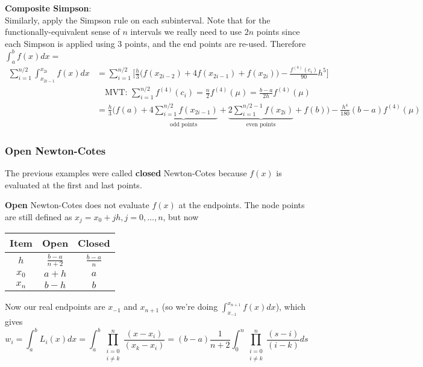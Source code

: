 \documentclass[12pt]{article}
\begin{document}
\textbf{Composite Simpson}:\\
Similarly, apply the Simpson rule on each subinterval. Note that for the functionally-equivalent sense of $n$ intervals we really need to use $2n$ points since each Simpson is applied using 3 points, and the end points are re-used. Therefore $\int_{a}^{b} f(x)dx = $
%
\begin{align*}
\sum_{i=1}^{n/2}\int_{x_{2i-1}}^{x_{2i}} f(x)dx &= \sum_{i=1}^{n/2} \bigl[ \frac{h}{3}\bigl(f(x_{2i-2}) + 4f(x_{2i-1}) + f(x_{2i})\bigr) - \frac{f^{(4)}(c_i)}{90}h^5 \bigr]\\
&\quad \text{MVT: } \sum_{i=1}^{n/2}f^{(4)}(c_i) = \frac{n}{2}f^{(4)}(\mu) = \frac{b-a}{2h}f^{(4)}(\mu)\\
&= \frac{h}{3}\bigl(f(a) + \underbrace{4\sum_{i=1}^{n/2} f(x_{2i-1})}_{\text{odd points}} + \underbrace{2\sum_{i=1}^{n/2-1} f(x_{2i})}_{\text{even points}} + f(b)\bigr) - \frac{h^4}{180}(b-a)f^{(4)}(\mu)
\end{align*}


\subsubsection*{Open Newton-Cotes}
The previous examples were called \textbf{closed} Newton-Cotes because $f(x)$ is evaluated at the first and last points.

\textbf{Open} Newton-Cotes does not evaluate $f(x)$ at the endpoints. The node points are still defined as $x_{j} = x_0 + jh, j = 0, \dots, n$,  but now 
\vspace*{-1em}
\begin{center}
\begin{tabular}{c c c}
Item & Open & Closed \\ \hline
$h$  & $\frac{b-a}{n+2}$ & $\frac{b-a}{n}$ \\
$x_0$ & $a+h$ & $a$ \\
$x_n$ & $b-h$ & $b$ \\
\end{tabular}
\end{center}
%
Now our real endpoints are $x_{-1}$ and $x_{n+1}$ (so we're doing $\int_{x_{-1}}^{x_{n+1}} f(x)dx$), which gives
\[
 w_i =  \int_a^b L_i(x)dx = \int_a^b \prod_{\substack{i=0\\ i \neq k}}^n \frac{(x-x_i)}{(x_k-x_i)} =  (b-a)\frac{1}{n+2}\int_0^n \prod_{\substack{i=0\\ i \neq k}}^n \frac{(s-i)}{(i-k)}ds
 \]
\end{document}
